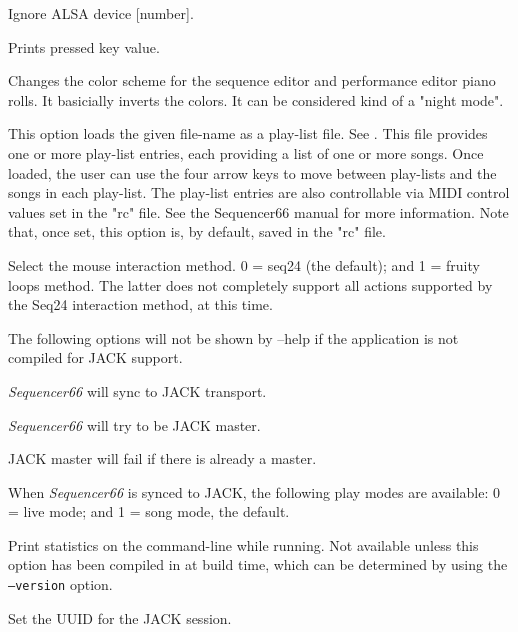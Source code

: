       Ignore ALSA device [number].

      Prints pressed key value.

      Changes the color scheme for the sequence editor and performance editor
      piano rolls.  It basicially inverts the colors.  It can be considered
      kind of a "night mode".

      This option loads the given file-name as a play-list file.
      See .
      This file provides one or more play-list
      entries, each providing a list of one or more songs.  Once loaded, the
      user can use the four arrow keys to move between play-lists and the songs
      in each play-list.  The play-list entries are also controllable via MIDI
      control values set in the "rc" file.  See the Sequencer66 manual for
      more information.  Note that, once set, this option is, by default, saved
      in the "rc" file.

      Select the mouse interaction method.
      0 = seq24 (the default); and 1 = fruity loops method.
      The latter does not completely support all actions supported by the Seq24
      interaction method, at this time.

      The following options will not be shown by --help if the application is
      not compiled for JACK support.

      \textsl{Sequencer66} will sync to JACK transport.

      \textsl{Sequencer66} will try to be JACK master.

      JACK master will fail if there is already a master.

      When \textsl{Sequencer66} is synced to JACK, the following play modes
      are available: 0 = live mode; and 1 = song mode, the default.

      Print statistics on the command-line while running.
      Not available unless this option has been compiled in at build time,
      which can be determined by using the \texttt{--version} option.

      Set the UUID for the JACK session.

